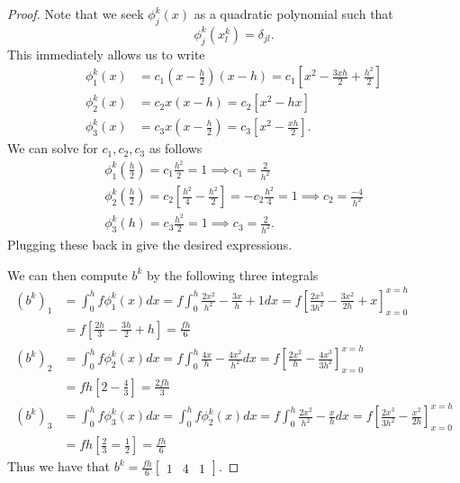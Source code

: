 \documentclass{amsart}
\theoremstyle{plain}
\theoremstyle{definition}
\begin{document}
\begin{proof}
    Note that we seek $\phi_{j}^k(x)$ as a quadratic polynomial such that 
    $$\phi_{j}^k\left(x_l^k\right) = \delta_{jl}.$$
    This immediately allows us to write 
    \begin{align*}
        \phi_1^k(x) &= c_1 \left(x-\frac{h}{2}\right)\left(x-h\right) = c_1\left[x^2 - \frac{3xh}{2} + \frac{h^2}{2}\right]\\
        \phi_2^k(x) &= c_2 x\left(x-h\right)=  c_2\left[x^2 - hx\right]\\
        \phi_3^k(x) &= c_3 x\left(x-\frac{h}{2}\right) = c_3\left[x^2 - \frac{xh}{2}\right].
    \end{align*}
    We can solve for $c_1,c_2,c_3$ as follows
    \begin{gather*}
        \phi_1^k\left(\frac{h}{2}\right) = c_1 \frac{h^2}{2} = 1 \implies c_1 = \frac{2}{h^2}\\
        \phi_2^k\left(\frac{h}{2}\right) = c_2 \left[\frac{h^2}{4}-\frac{h^2}{2}\right] = -c_2 \frac{h^2}{4} = 1 \implies c_2 = \frac{-4}{h^2}\\
        \phi_3^k(h) = c_3 \frac{h^2}{2} = 1 \implies c_3 = \frac{2}{h^2}.
    \end{gather*}
    Plugging these back in give the desired expressions. 
    \par We can then compute $b^k$ by the following three integrals
    \begin{align*}
        \left(b^k\right)_1 &= \int_0^h f \phi_1^k(x) dx = f\int_0^h \frac{2x^2}{h^2}-\frac{3x}{h}+1 dx = f\left[\frac{2x^3}{3h^2}-\frac{3x^2}{2h}+x\right]_{x=0}^{x=h}\\
        &= f \left[\frac{2h}{3}-\frac{3h}{2}+h\right] = \frac{fh}{6}\\
        \left(b^k\right)_2 &= \int_0^h f \phi_2^k(x) dx = f\int_0^h \frac{4x}{h}-\frac{4x^2}{h^2} dx = f\left[\frac{2x^2}{h}-\frac{4x^3}{3h^2}\right]_{x=0}^{x=h}\\
        &= fh\left[2-\frac{4}{3}\right] = \frac{2fh}{3}\\
        \left(b^k\right)_3 &= \int_0^h f \phi_3^k(x) dx = \int_0^h f \phi_2^k(x) dx = f\int_0^h \frac{2x^2}{h^2}-\frac{x}{h} dx = f\left[\frac{2x^3}{3h^2}-\frac{x^2}{2h}\right]_{x=0}^{x=h}\\
        &= fh\left[\frac{2}{3}=\frac{1}{2}\right] = \frac{fh}{6} 
    \end{align*}
    Thus we have that $b^k = \frac{fh}{6}\begin{bmatrix}
        1 & 4 & 1
    \end{bmatrix}.$

\end{proof}
\end{document}
